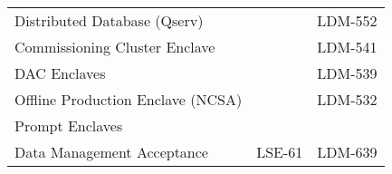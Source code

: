 \begin{longtable}{p{}p{}p{}}
Distributed Database (Qserv)      &                              &   \cellcolor{dmblue} LDM-552 \\
Commissioning Cluster Enclave     &                              & \cellcolor{dmyellow} LDM-541 \\
DAC Enclaves                      &                              & \cellcolor{dmyellow} LDM-539 \\
Offline Production Enclave (NCSA) &                              & \cellcolor{dmyellow} LDM-532 \\
Prompt Enclaves                   &                              &                              \\
Data Management Acceptance        &    \cellcolor{dmblue} LSE-61 & \cellcolor{dmorange} LDM-639 \\
\hline

\end{longtable}
